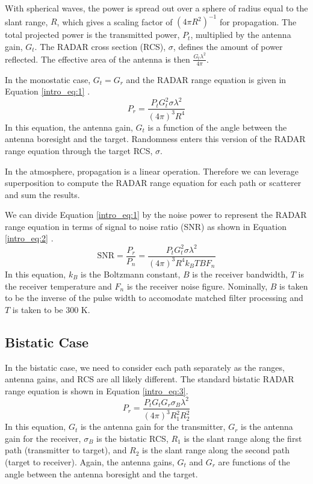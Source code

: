 With spherical waves, the power is spread out over a sphere of radius equal to the slant range, $R$, which gives a scaling factor of $\left( 4\pi R^2 \right)^{-1}$ for propagation. The total projected power is the transmitted power, $P_t$, multiplied by the antenna gain, $G_t$. The RADAR cross section (RCS), $\sigma$, defines the amount of power reflected. The effective area of the antenna is then $\frac{G_t\lambda^2}{4\pi}$.

In the monostatic case, $G_t = G_r$ and the RADAR range equation is given in Equation \ref{intro_eq:1} \cite{skolnik_radar}.
  \begin{equation}
  \label{intro_eq:1}
 P_r = \frac{P_tG_t^2\sigma\lambda^2}{\left(4\pi\right)^3R^4}
  \end{equation}
In this equation, the antenna gain, $G_t$ is a function of the angle between the antenna boresight and the target. Randomness enters this version of the RADAR range equation through the target RCS, $\sigma$.

In the atmosphere, propagation is a linear operation. Therefore we can leverage superposition to compute the RADAR range equation for each path or scatterer and sum the results.

We can divide Equation \ref{intro_eq:1} by the noise power to represent the RADAR range equation in terms of signal to noise ratio (SNR) as shown in Equation \ref{intro_eq:2} \cite{skolnik_handbook}.
\begin{equation}
    \label{intro_eq:2}
\text{SNR} = \frac{P_r}{P_n} = \frac{P_tG_t^2\sigma\lambda^2}{\left(4\pi\right)^3 R^4k_BTBF_n}
\end{equation}
In this equation, $k_B$ is the Boltzmann constant, $B$ is the receiver bandwidth, $T$ is the receiver temperature and $F_n$ is the receiver noise figure. Nominally, $B$ is taken to be the inverse of the pulse width to accomodate matched filter processing and $T$ is taken to be $300$ K.

\subsection{Bistatic Case}
In the bistatic case, we need to consider each path separately as the ranges, antenna gains, and RCS are all likely different. The standard bistatic RADAR range equation is shown in Equation \ref{intro_eq:3}.
  \begin{equation}
  \label{intro_eq:3}
 P_r = \frac{P_tG_tG_r\sigma_B\lambda^2}{\left(4\pi\right)^3R_1^2R_2^2}
  \end{equation}
In this equation, $G_t$ is the antenna gain for the transmitter, $G_r$ is the antenna gain for the receiver, $\sigma_B$ is the bistatic RCS, $R_1$ is the slant range along the first path (transmitter to target), and $R_2$ is the slant range along the second path (target to receiver). Again, the antenna gains, $G_t$ and $G_r$ are functions of the angle between the antenna boresight and the target.

